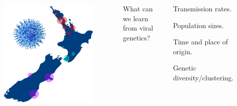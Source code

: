 \documentclass{beamer}
\begin{document}
\begin{frame}

\begin{columns}[c] %


\begin{figure}
\includegraphics[width=0.8\linewidth]{nz1.png}
\end{figure}

What can we learn from viral genetics?

\begin{itemize}
\scriptsize{
\item Transmission rates.
\item Population sizes.
\item Time and place of origin.
\item Genetic diversity/clustering.}
\end{itemize}



\end{columns}
\end{frame}
\end{document}
